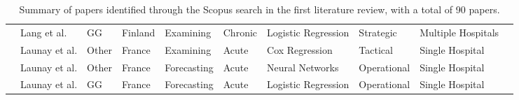 \documentclass[thesis.tex]{subfiles}
\begin{document}
\begin{landscape}
\begin{table}[H]
{\begin{tabular}{@{}llllllllll@{}}
    \cite{Lang2009}  & Lang et al. & GG & Finland & Examining & Chronic & Logistic Regression & Strategic & Multiple Hospitals \\
    \cite{Launay2014} & Launay et al. & Other & France & Examining & Acute & Cox Regression & Tactical & Single Hospital \\
    \cite{Launay2015} & Launay et al. & Other & France & Forecasting & Acute & Neural Networks & Operational & Single Hospital \\
    \cite{Launay2018} & Launay et al. & GG & France & Forecasting & Acute & Logistic Regression & Operational & Single Hospital \\
       \bottomrule
    \end{tabular}
    }    
    \caption{Summary of papers identified through the Scopus search in the first literature review, with a total of 90 papers.}
\end{table}


\end{landscape}
\end{document}
